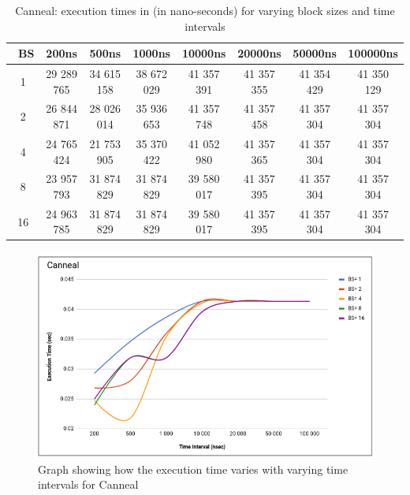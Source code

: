 \documentclass{listhesis}
\begin{document}
\begin{table}[h!]
\begin{center}
 \begin{tabular}{|| c | c | c | c| c | c | c | c||} 
 \hline
 \ \textbf{BS} & \textbf{200ns} & \textbf{500ns}  & \textbf{1000ns} & \textbf{10000ns} & \textbf{20000ns} & \textbf{50000ns} & \textbf{100000ns}\\ [0.5 ex] 
 \hline\hline
   1 & 29 289 765 & 34 615 158 &  38 672 029 & 41 357 391 & 41 357 355 & 41 354 429 &  41 350 129 \\ 
 \hline
   2 & 26 844 871 & 28 026 014 & 35 936 653 & 41 357 748 & 41 357 458 & 41 357 304 & 41 357 304 \\
 \hline
   4 & 24 765 424 & 21 753 905 & 35 370 422 & 41 052 980 & 41 357 365 & 41 357 304 & 41 357 304 \\
 \hline
   8 & 23 957 793 & 31 874 829 & 31 874 829 & 39 580 017 & 41 357 395 & 41 357 304 & 41 357 304 \\
  \hline
   16 & 24 963 785 & 31 874 829 & 31 874 829 & 39 580 017 & 41 357 395 & 41 357 304 & 41 357 304 \\
    \hline
\end{tabular}
 \caption{Canneal: execution times in (in nano-seconds) for varying block sizes and time intervals}
 \label{table:ExecTimes2}
\end{center}
\end{table}

\begin{figure}
  \includegraphics[width=\linewidth]{cann_var_bs_t.png}
  \centering
  \caption{Graph showing how the execution time varies with varying time intervals for Canneal}
  \label{fig:cann_var_bs_t.png}
\end{figure}
\end{document}
